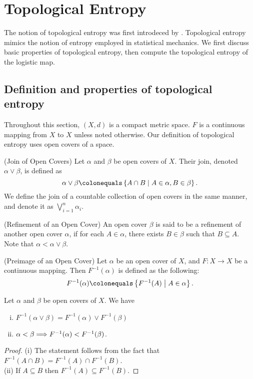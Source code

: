 \documentclass[12pt,twoside,draft]{book}
\begin{document}
\chapter{Topological Entropy}
The notion of topological entropy was first introdeced by \citet{akm}.
Topological entropy mimics the notion of entropy employed in statistical mechanics.
We first discuss basic properties of topological entropy, then compute the topological entropy of the logistic map.


\section{Definition and properties of topological entropy}
Throughout this section, $(X,d)$ is a compact metric space.
$F$ is a continuous mapping from $X$ to $X$ unless noted otherwise.
Our definition of topological entropy uses open covers of a space. 

\begin{definition}
  (Join of Open Covers)
  Let $\alpha$ and $\beta$ be open covers of $X$.
  Their join, denoted $\alpha \vee \beta$, is defined as
  \begin{equation*}
    \alpha \vee \beta \ceq \setst{A \cap B}{A \in \alpha, B \in \beta}.
  \end{equation*}
  We define the join of a countable collection of open covers in the same manner, and denote it as $\bigvee\limits_{i = 1}^{n} \alpha_i$.
\end{definition}

\begin{definition}
  (Refinement of an Open Cover)
  An open cover $\beta$ is said to be a refinement of another open cover $\alpha$, if for each $A \in \alpha$, there exists $B \in \beta$ such that $B \subseteq A$.
  Note that $\alpha < \alpha \vee \beta$.
\end{definition}

\begin{definition}
  (Preimage of an Open Cover)
  Let $\alpha$ be an open cover of $X$, and $F: X \to X$ be a continuous mapping.
  Then $F^{-1}(\alpha)$ is defined as the following:
  \begin{equation*}
    F^{-1}(\alpha) \ceq \setst{F^{-1}(A)}{A \in \alpha}.
  \end{equation*}
\end{definition}
\begin{proposition}
  Let $\alpha$ and $\beta$ be open covers of $X$.
  We have
  \begin{enumerate}[(i)]
    \item $F^{-1}(\alpha \vee  \beta) = F^{-1}(\alpha) \vee F^{-1}(\beta)$
    \item $\alpha < \beta \Longrightarrow F^{-1}(\alpha) < F^{-1}(\beta)$.
  \end{enumerate}
  \begin{proof}
    (i) The statement follows from the fact that $F^{-1}(A \cap B) = F^{-1}(A) \cap F^{-1}(B)$. \\
    (ii) If $A \subseteq B$ then $F^{-1}(A) \subseteq F^{-1}(B)$.
  \end{proof}
\end{proposition}
\end{document}
